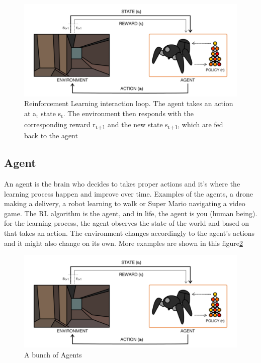 \begin{figure}[H]
		\begin{center}
				\includegraphics[width=.5\linewidth]{figures/Agent-Env.png}
				\caption{Reinforcement Learning interaction loop. The agent takes an action at a\textsubscript{t} state s\textsubscript{t}. The environment then responds with the corresponding reward r\textsubscript{t+1} and the new state s\textsubscript{t+1}, which are fed back to the agent~\parencite{arulkumaran2017brief}}
				\label{fig:agent_env}
		\end{center}
\end{figure}

\subsection{Agent}\label{Agent}
An agent is the brain who decides to takes proper actions and it's where the learning process happen and improve over time. Examples of the agents, a drone making a delivery, a robot learning to walk or Super Mario navigating a video game. The RL algorithm is the agent, and in life, the agent is you (human being). 
for the learning process, the agent observes the state of the world and based on that takes an action. The environment changes accordingly to the agent's actions and it might also change on its own. 
More examples are shown in this figure\ref{fig:agents}

\begin{figure}[H]
		\begin{center}
				\includegraphics[width=.5\linewidth]{figures/Agent-Env.png}
				\caption{A bunch of Agents}
				\label{fig:agents}
		\end{center}
\end{figure}

